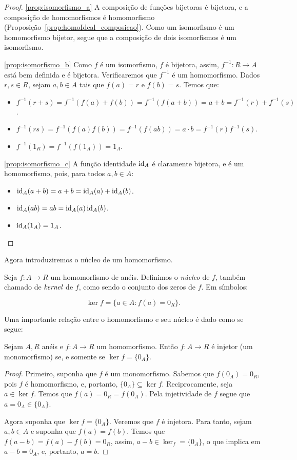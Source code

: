 \begin{proof}
\ref{prop:isomorfismo_a} A composição de funções bijetoras é bijetora, e a composição de homomorfismos é homomorfismo (Proposição~\ref{prop:homoIdeal_composicao}).
Como um isomorfismo é um homomorfismo bijetor, segue que a composição de dois isomorfismos é um isomorfismo.

\ref{prop:isomorfismo_b} Como $f$ é um isomorfismo, $f$ é bijetora, assim, $f^{-1}:R\rightarrow A$ está bem definida e é bijetora. Verificaremos que $f^{-1}$ é um homomorfismo. Dados $r, s \in R$, sejam $a, b \in A$ tais que $f(a)=r$ e $f(b)=s$. Temos que:
\begin{itemize}
    \item $f^{-1}(r+s)=f^{-1}(f(a)+f(b))=f^{-1}(f(a+b))=a+b=f^{-1}(r)+f^{-1}(s)$.
    \item $f^{-1}(rs)=f^{-1}(f(a)f(b))=f^{-1}(f(ab))=a\cdot b=f^{-1}(r)f^{-1}(s)$.
    \item $f^{-1}(1_R)=f^{-1}(f(1_A))=1_A$.
\end{itemize}

\ref{prop:isomorfismo_c} A função identidade $\operatorname{id}_A$ é claramente bijetora, e é um homomorfismo, pois, para todos $a, b \in A$:
    \begin{itemize}
        \item $\operatorname{id}_A(a+b)=a+b=\operatorname{id}_A(a)+\operatorname{id}_A(b)$.
        \item $\operatorname{id}_A(ab)=ab=\operatorname{id}_A(a)\operatorname{id}_A(b)$.
        \item $\operatorname{id}_A(1_A)=1_A$.
    \end{itemize}
\end{proof}

Agora introduziremos o núcleo de um homomorfismo.
\begin{definition}
    Seja $f: A\rightarrow R$ um homomorfismo de anéis.
    Definimos o \emph{núcleo} de $f$, também chamado de $\emph{kernel}$ de $f$, como sendo o conjunto dos zeros de $f$.
    Em símbolos:

    \[\ker f=\{a \in A: f(a)=0_R\}.\]
\end{definition}
Uma importante relação entre o homomorfismo e seu núcleo é dado como se segue:

\begin{prop}
Sejam $A, R$ anéis e $f:A\rightarrow R$ um homomorfismo. Então $f:A\rightarrow R$ é injetor (um monomorfismo) se, e somente se $\ker f = \{0_A\}$.
\end{prop}

\begin{proof}
    Primeiro, suponha que $f$ é um monomorfismo.
    Sabemos que $f(0_A)=0_R$, pois $f$ é homomorfismo, e, portanto, $\{0_A\}\subseteq \ker f$.
    Reciprocamente, seja $a \in \ker f$.
    Temos que $f(a)=0_R=f(0_A)$. Pela injetividade de $f$ segue que $a=0_A\in \{0_A\}$.

    Agora suponha que $\ker f=\{0_A\}$.
    Veremos que $f$ é injetora.
    Para tanto, sejam $a, b \in A$ e suponha que $f(a)=f(b)$.
    Temos que $f(a-b)=f(a)-f(b)=0_R$, assim, $a-b\in \ker_f = \{0_A\}$, o que implica em $a-b=0_A$, e, portanto, $a=b$.
\end{proof}
